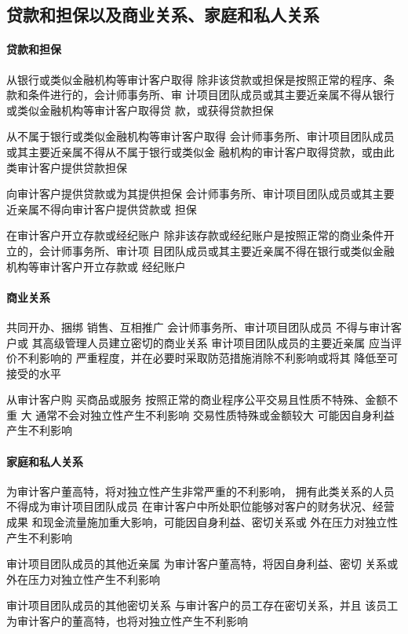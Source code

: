 \documentclass[UTF8,12pt]{ctexart}
\numberwithin{equation}{section} %
\numberwithin{figure}{section}
\numberwithin{table}{section}
\begin{document}
	
	\subsection{贷款和担保以及商业关系、家庭和私人关系}
	\paragraph{贷款和担保}
	从银行或类似金融机构等审计客户取得
	除非该贷款或担保是按照正常的程序、条款和条件进行的，会计师事务所、审 计项目团队成员或其主要近亲属不得从银行或类似金融机构等审计客户取得贷 款，或获得贷款担保
	
	从不属于银行或类似金融机构等审计客户取得 
	会计师事务所、审计项目团队成员或其主要近亲属不得从不属于银行或类似金 融机构的审计客户取得贷款，或由此类审计客户提供贷款担保 
	
	向审计客户提供贷款或为其提供担保 
	会计师事务所、审计项目团队成员或其主要近亲属不得向审计客户提供贷款或 担保
	
	在审计客户开立存款或经纪账户 
	除非该存款或经纪账户是按照正常的商业条件开立的，会计师事务所、审计项 目团队成员或其主要近亲属不得在银行或类似金融机构等审计客户开立存款或 经纪账户
	
	\paragraph{商业关系}
	共同开办、捆绑 销售、互相推广
	会计师事务所、审计项目团队成员  不得与审计客户或
	其高级管理人员建立密切的商业关系
	审计项目团队成员的主要近亲属  应当评价不利影响的
	严重程度，并在必要时采取防范措施消除不利影响或将其
	降低至可接受的水平
	
	
	从审计客户购 买商品或服务
	按照正常的商业程序公平交易且性质不特殊、金额不重 大 通常不会对独立性产生不利影响 交易性质特殊或金额较大 可能因自身利益产生不利影响
	
	\paragraph{家庭和私人关系}
	为审计客户董高特，将对独立性产生非常严重的不利影响， 拥有此类关系的人员不得成为审计项目团队成员 在审计客户中所处职位能够对客户的财务状况、经营成果 和现金流量施加重大影响，可能因自身利益、密切关系或 外在压力对独立性产生不利影响
	
	审计项目团队成员的其他近亲属    为审计客户董高特，将因自身利益、密切 关系或外在压力对独立性产生不利影响
	
	审计项目团队成员的其他密切关系    与审计客户的员工存在密切关系，并且 该员工为审计客户的董高特，也将对独立性产生不利影响
	
\end{document}
